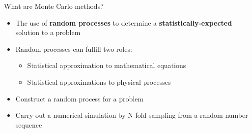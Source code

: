 \documentclass[xcolor=x11names,compress,handout]{beamer}
\renewcommand{\(}{\begin{columns}}
\renewcommand{\)}{\end{columns}}
\newcommand{\<}[1]{\begin{column}{#1}}
\renewcommand{\>}{\end{column}}
\begin{document}


\begin{frame}{What are Monte Carlo methods?}

  \begin{itemize}
  \item The use of \textbf{random processes} to determine a 
        \textbf{statistically-expected} solution to a problem
  \vspace*{1em}
  \item Random processes can fulfill two roles:
  \begin{itemize}
    \item Statistical approximation to \alert{mathematical equations}
    \item Statistical approximations to \alert{physical processes}
  \end{itemize}   
 \vspace*{1em} 
  \item Construct a random process for a problem
  \item Carry out a numerical simulation by N-fold sampling from a random number sequence
\end{itemize}
\end{frame}
\end{document}
